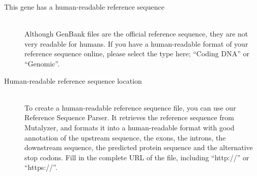 \documentclass[a4paper,oneside,openany,12pt]{memoir}
\begin{document}
\begin{description}
  \item[This gene has a human-readable reference sequence] \hfill \\
  Although GenBank files are the official reference sequence, they are not very readable for humans.
  If you have a human-readable format of your reference sequence online, please select the type here; ``Coding DNA'' or ``Genomic''.
  \item[Human-readable reference sequence location] \hfill \\
  To create a human-readable reference sequence file, you can use our Reference Sequence Parser.
  It retrieves the reference sequence from Mutalyzer, and formats it into a human-readable format with good annotation of the upstream sequence, the exons, the introns, the downstream sequence, the predicted protein sequence and the alternative stop codons.
  Fill in the complete URL of the file, including ``http://'' or ``https://''.
\end{description}
\end{document}
